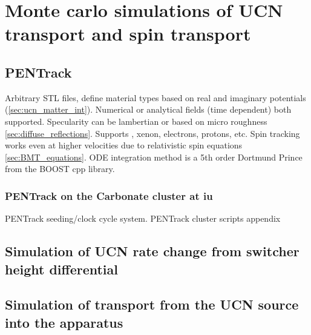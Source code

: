 
\chapter{Monte carlo simulations of UCN transport and spin transport}\label{chap:simulations}



\section{PENTrack}


Arbitrary STL files, define material types based on real and imaginary potentials (\ref{sec:ucn_matter_int}). Numerical or analytical fields (time dependent) both supported. Specularity can be lambertian or based on micro roughness \ref{sec:diffuse_reflections}. Supports \hg, xenon, electrons, protons, etc. Spin tracking works even at higher velocities due to relativistic spin equations \ref{sec:BMT_equations}. ODE integration method is a 5th order Dortmund Prince \cite{numerical_recipes} from the BOOST cpp library. \cite{schreyer_pentrack}


\subsection
{
    \texorpdfstring{PENTrack on the Carbonate cluster at \acrshort{iu}}
                    {PENTrack on the Carbonate cluster at IU}
}


PENTrack seeding/clock cycle system. PENTrack cluster scripts appendix


\section{Simulation of UCN rate change from switcher height differential}



\section{Simulation of transport from the UCN source into the apparatus}

